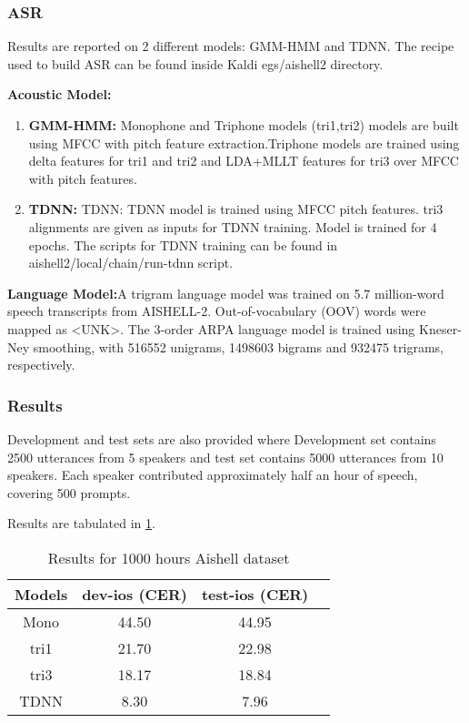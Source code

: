 \documentclass[12pt]{article}
\begin{document}
\subsubsection{ASR}
Results are reported on 2 different models: GMM-HMM and TDNN. The recipe used to build ASR can be found inside Kaldi egs/aishell2 directory. 

\textbf{Acoustic Model:}

\begin{enumerate}
\item {\textbf{GMM-HMM:}} Monophone and Triphone models (tri1,tri2) models are built using MFCC with pitch feature extraction.Triphone models are trained using delta features for tri1 and tri2 and LDA+MLLT features for tri3 over MFCC with pitch features.

\item \textbf{TDNN:} TDNN: TDNN model is trained using MFCC pitch features. tri3 alignments are given as inputs for TDNN training. Model is trained for 4 epochs.
The scripts for TDNN training can be found in aishell2/local/chain/run-tdnn script.
\end{enumerate}

\textbf{Language Model:}A trigram language model was trained on 5.7 million-word speech transcripts from AISHELL-2. Out-of-vocabulary (OOV) words were mapped as <UNK>.
The 3-order ARPA language model is trained using Kneser-Ney smoothing,
with 516552 unigrams, 1498603 bigrams and 932475 trigrams, respectively.

\subsubsection{Results}

Development and test sets are also provided where Development set contains
2500 utterances from 5 speakers and test set contains 5000 utterances from 10
speakers. Each speaker contributed approximately half an hour of speech,
covering 500 prompts.

Results are tabulated in \ref{tab:aishell}.
\begin{table} [h!]
	\centering
		\caption{Results for 1000 hours Aishell dataset}
		
\label{tab:aishell}
\begin{tabular}{ | c || c || c | c | }
\hline Models & dev-ios (CER) & test-ios (CER)\\ 
\hline
\hline Mono & 44.50 & 44.95\\
\hline tri1 & 21.70 & 22.98\\
\hline tri3 & 18.17 & 18.84\\
\hline TDNN & 8.30 & 7.96\\
\hline
\end{tabular}
\end{table}
\end{document}
